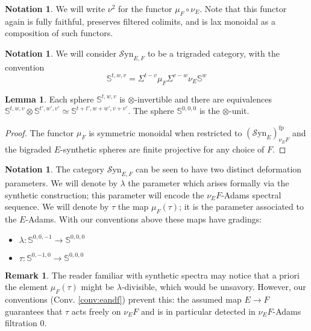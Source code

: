 \documentclass[10pt]{amsart}
\theoremstyle{definition}
\numberwithin{figure}{section}
\numberwithin{equation}{section}
\newtheorem{lemma}[figure]{Lemma}
\newtheorem{notation}[figure]{Notation}
\newtheorem{remark}[figure]{Remark}
\theoremstyle{cited}
\newcommand{\bS}{\mathbb{S}}
\newcommand{\fp}{\mathrm{fp}}
\newcommand{\Syn}{\mathcal{S}\mathrm{yn}}
\begin{document}
\begin{notation}
  We will write $\nu^2$ for the functor $\mu_F\circ \nu_E$. Note that this functor again is fully faithful, preserves filtered colimits, and is lax monoidal as a composition of such functors.
\end{notation}

\begin{notation}
  We will consider $\Syn_{E,F}$ to be a trigraded category, with the convention
  \[
  \bS^{t,w,v}=\Sigma^{t-v}\mu_F\Sigma^{v-w}\nu_E\bS^w
  \]
\end{notation}

\begin{lemma}
  Each sphere $\bS^{t,w,v}$ is $\otimes$-invertible and there are equivalences $\bS^{t,w,v}\otimes \bS^{t',w',v'}\simeq \bS^{t+t',w+w',v+v'}$. The sphere $\bS^{0,0,0}$ is the $\otimes$-unit.
\end{lemma}

\begin{proof}
  The functor $\mu_F$ is symmetric monoidal when restricted to $(\Syn_{E})^\fp_{\nu_E F}$ and the bigraded $E$-synthetic spheres are finite projective for any choice of $F$.
\end{proof}

\begin{notation}
  The category $\Syn_{E,F}$ can be seen to have two distinct deformation parameters. We will denote by $\lambda$ the parameter which arises formally via the synthetic construction; this parameter will encode the $\nu_E F$-Adams spectral sequence. We will denote by $\tau$ the map $\mu_F(\tau)$; it is the parameter associated to the $E$-Adams. With our conventions above these maps have gradings:
  \begin{itemize}
    \item $\lambda:\bS^{0,0,-1}\to \bS^{0,0,0}$
    \item $\tau:\bS^{0,-1,0}\to \bS^{0,0,0}$
  \end{itemize}
\end{notation}

\begin{remark}
  The reader familiar with synthetic spectra may notice that a priori the element $\mu_F(\tau)$ might be $\lambda$-divisible, which would be unsavory. However, our conventions (Conv. \ref{conv:eandf}) prevent this: the assumed map $E\to F$ guarantees that $\tau$ acts freely on $\nu_E F$ and is in particular detected in $\nu_E F$-Adams filtration $0$.
\end{remark}
\end{document}
